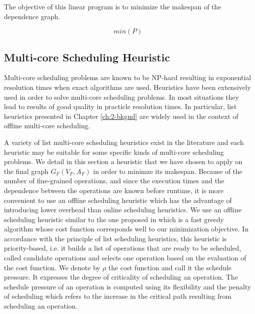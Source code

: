 The objective of this linear program is to minimize the makespan of the dependence graph.

\begin{equation}
min(P)
\label{sched:obj}
\end{equation}


\subsection{Multi-core Scheduling Heuristic}

Multi-core scheduling problems are known to be NP-hard resulting in exponential resolution times when exact algorithms are used. Heuristics have been extensively used in order to solve multi-core scheduling problems. In most situations they lead to results of good quality in practicle resolution times. In particular, list heuristics presented in Chapter \ref{ch:2-bkgnd} are widely used in the context of offline multi-core scheduling.

A variety of list multi-core scheduling heuristics exist in the literature and each heuristic may be suitable for some specific kinds of multi-core scheduling problems. We detail in this section a heuristic that we have chosen to apply on the final graph $G_F(V_F,A_F)$ in order to minimze its makespan. Because of the number of fine-grained operations, and since the execution times and the dependence between the operations are known before runtime, it is more convenient to use an offline scheduling heuristic which has the advantage of introducing lower overhead than online scheduling heuristics. We use an offline scheduling heuristic similar to the one proposed in \cite{grandpierre:1999} which is a fast greedy algorithm whose cost function corresponds well to our minimization objective. In accordance with the principle of list scheduling heuristics, this heuristic is priority-based, i.e. it builds a list of operations that are ready to be scheduled, called candidate operations and selects one operation based on the evaluation of the cost function. We denote by $\rho$ the cost function and call it the schedule pressure. It expresses the degree of criticality of scheduling an operation. The schedule pressure of an operation is computed using its flexibility and the penalty of scheduling which refers to the increase in the critical path resulting from scheduling an operation.  

